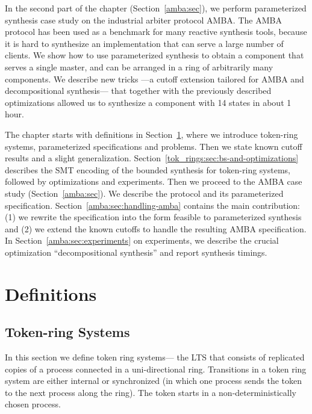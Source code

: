 In the second part of the chapter (Section~\ref{amba:sec}),
we perform parameterized synthesis case study on the industrial arbiter protocol AMBA.
The AMBA protocol has been used as a benchmark for many reactive synthesis tools,
because it is hard to synthesize an implementation that can serve
a large number of clients. We show how to use parameterized synthesis
to obtain a component that serves a single master, and can be arranged
in a ring of arbitrarily many components.
We describe new tricks%
---a cutoff extension tailored for AMBA and decompositional synthesis---%
that together with the previously described optimizations allowed us
to synthesize a component with 14 states in about 1 hour.

The chapter starts with definitions in Section~\ref{tok_rings:defs},
where we introduce token-ring systems, parameterized specifications and problems.
Then we state known cutoff results and a slight generalization.
Section~\ref{tok_rings:sec:bs-and-optimizations} describes
the SMT encoding of the bounded synthesis for token-ring systems,
followed by optimizations and experiments.
Then we proceed to the AMBA case study (Section~\ref{amba:sec}).
We describe the protocol and its parameterized specification.
Section~\ref{amba:sec:handling-amba} contains the main contribution:
(1) we rewrite the specification into the form feasible to parameterized synthesis and
(2) we extend the known cutoffs to handle the resulting AMBA specification.
In Section~\ref{amba:sec:experiments} on experiments,
we describe the crucial optimization ``decompositional synthesis''
and report synthesis timings.

\section{Definitions} \label{tok_rings:defs}

\subsection{Token-ring Systems} \label{tok_rings:defs:system}
In this section we define token ring systems---%
the LTS that consists of replicated copies of a process connected in a uni-directional ring.
Transitions in a token ring system are either internal or synchronized
(in which one process sends the token to the next process along the ring).
The token starts in a non-deterministically chosen process.

